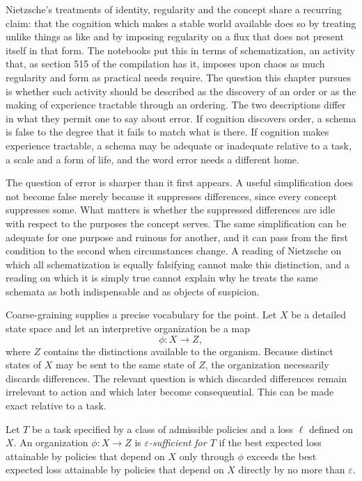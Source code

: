 Nietzsche's treatments of identity, regularity and the concept share a recurring claim: that the cognition which makes a stable world available does so by treating unlike things as like and by imposing regularity on a flux that does not present itself in that form. The notebooks put this in terms of schematization, an activity that, as section 515 of the compilation has it, imposes upon chaos as much regularity and form as practical needs require. The question this chapter pursues is whether such activity should be described as the discovery of an order or as the making of experience tractable through an ordering. The two descriptions differ in what they permit one to say about error. If cognition discovers order, a schema is false to the degree that it fails to match what is there. If cognition makes experience tractable, a schema may be adequate or inadequate relative to a task, a scale and a form of life, and the word error needs a different home.

The question of error is sharper than it first appears. A useful simplification does not become false merely because it suppresses differences, since every concept suppresses some. What matters is whether the suppressed differences are idle with respect to the purposes the concept serves. The same simplification can be adequate for one purpose and ruinous for another, and it can pass from the first condition to the second when circumstances change. A reading of Nietzsche on which all schematization is equally falsifying cannot make this distinction, and a reading on which it is simply true cannot explain why he treats the same schemata as both indispensable and as objects of suspicion.

Coarse-graining supplies a precise vocabulary for the point. Let $X$ be a detailed state space and let an interpretive organization be a map
\[
\phi : X \longrightarrow Z,
\]
where $Z$ contains the distinctions available to the organism. Because distinct states of $X$ may be sent to the same state of $Z$, the organization necessarily discards differences. The relevant question is which discarded differences remain irrelevant to action and which later become consequential. This can be made exact relative to a task.

\begin{definition}
Let $T$ be a task specified by a class of admissible policies and a loss $\ell$ defined on $X$. An organization $\phi:X\to Z$ is \emph{$\varepsilon$-sufficient for $T$} if the best expected loss attainable by policies that depend on $X$ only through $\phi$ exceeds the best expected loss attainable by policies that depend on $X$ directly by no more than $\varepsilon$.
\end{definition}

